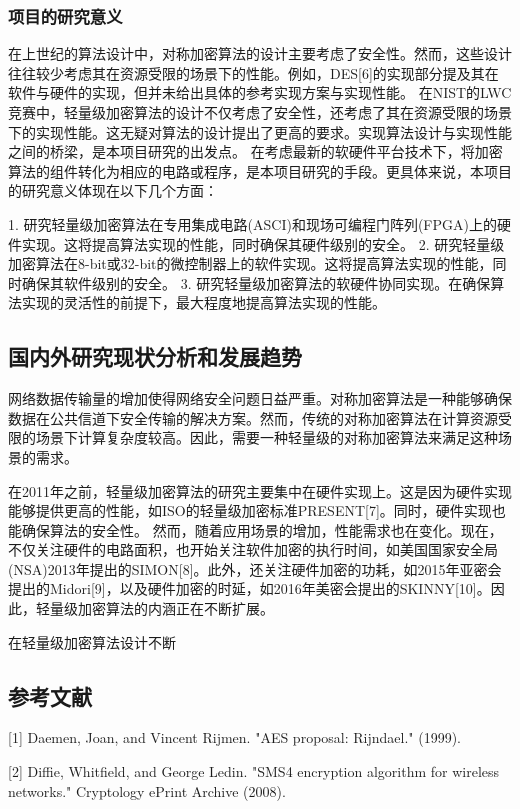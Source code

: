 \documentclass{ctexart}
\begin{document}
\subsubsection{项目的研究意义}
在上世纪的算法设计中，对称加密算法的设计主要考虑了安全性。然而，这些设计往往较少考虑其在资源受限的场景下的性能。例如，DES[6]的实现部分提及其在软件与硬件的实现，但并未给出具体的参考实现方案与实现性能。
在NIST的LWC竞赛中，轻量级加密算法的设计不仅考虑了安全性，还考虑了其在资源受限的场景下的实现性能。这无疑对算法的设计提出了更高的要求。实现算法设计与实现性能之间的桥梁，是本项目研究的出发点。
在考虑最新的软硬件平台技术下，将加密算法的组件转化为相应的电路或程序，是本项目研究的手段。更具体来说，本项目的研究意义体现在以下几个方面：

1. 研究轻量级加密算法在专用集成电路(ASCI)和现场可编程门阵列(FPGA)上的硬件实现。这将提高算法实现的性能，同时确保其硬件级别的安全。
2. 研究轻量级加密算法在8-bit或32-bit的微控制器上的软件实现。这将提高算法实现的性能，同时确保其软件级别的安全。
3. 研究轻量级加密算法的软硬件协同实现。在确保算法实现的灵活性的前提下，最大程度地提高算法实现的性能。


\subsection{国内外研究现状分析和发展趋势}

网络数据传输量的增加使得网络安全问题日益严重。对称加密算法是一种能够确保数据在公共信道下安全传输的解决方案。然而，传统的对称加密算法在计算资源受限的场景下计算复杂度较高。因此，需要一种轻量级的对称加密算法来满足这种场景的需求。

在2011年之前，轻量级加密算法的研究主要集中在硬件实现上。这是因为硬件实现能够提供更高的性能，如ISO的轻量级加密标准PRESENT[7]。同时，硬件实现也能确保算法的安全性。
然而，随着应用场景的增加，性能需求也在变化。现在，不仅关注硬件的电路面积，也开始关注软件加密的执行时间，如美国国家安全局(NSA)2013年提出的SIMON[8]。此外，还关注硬件加密的功耗，如2015年亚密会提出的Midori[9]，以及硬件加密的时延，如2016年美密会提出的SKINNY[10]。因此，轻量级加密算法的内涵正在不断扩展。

在轻量级加密算法设计不断


\subsection{参考文献}
[1] Daemen, Joan, and Vincent Rijmen. "AES proposal: Rijndael." (1999).

[2] Diffie, Whitfield, and George Ledin. "SMS4 encryption algorithm for wireless networks." Cryptology ePrint Archive (2008).
\end{document}
